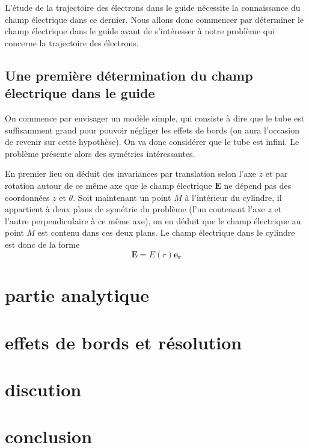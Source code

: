 \documentclass[a4paper,12pt]{article}
\begin{document}
L'étude de la trajectoire des électrons dans le guide nécessite la connaissance du champ électrique dans ce dernier. Nous allons donc commencer par déterminer le champ électrique dans le guide avant de s'intéresser à notre problème qui concerne la trajectoire des électrons.

\subsection{Une première détermination du champ électrique dans le guide}

On commence par envisager un modèle simple, qui consiste à dire que le tube est suffisamment grand pour pouvoir négliger les effets de bords (on aura l'occasion de revenir sur cette hypothèse). On va donc considérer que le tube est infini. Le problème présente alors des symétries intéressantes.

En premier lieu on déduit des invariances par translation selon l'axe $z$ et par rotation autour de ce même axe que le champ électrique $\mathbf{E}$ ne dépend pas des coordonnées $z$ et $\theta$. Soit maintenant un point $M$ à l'intérieur du cylindre, il appartient à deux plans de symétrie du problème (l'un contenant l'axe $z$ et l'autre perpendiculaire à ce même axe), on en déduit que le champ électrique au point $M$ est contenu dans ces deux plans. Le champ électrique dans le cylindre est donc de la forme
\begin{equation}
\mathbf{E} = E(r) \mathbf{e_r}
\end{equation} 



\section{partie analytique}


\section{effets de bords et résolution}


\section{discution}



\section{conclusion}
\end{document}
